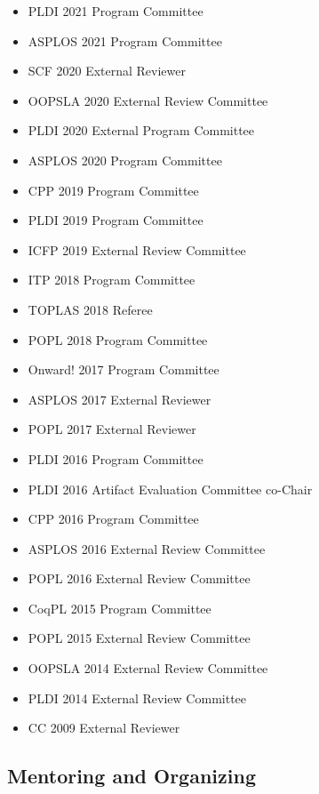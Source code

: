 \documentclass[10pt]{article}
\begin{document}
\begin{itemize}
  \item PLDI 2021 Program Committee
  \item ASPLOS 2021 Program Committee
  \item SCF 2020 External Reviewer
  \item OOPSLA 2020 External Review Committee
  \item PLDI 2020 External Program Committee
  \item ASPLOS 2020 Program Committee
  \item CPP 2019 Program Committee
  \item PLDI 2019 Program Committee
  \item ICFP 2019 External Review Committee
  \item ITP 2018 Program Committee
  \item TOPLAS 2018 Referee
  \item POPL 2018 Program Committee
  \item Onward! 2017 Program Committee
  \item ASPLOS 2017 External Reviewer
  \item POPL 2017 External Reviewer
  \item PLDI 2016 Program Committee
  \item PLDI 2016 Artifact Evaluation Committee co-Chair
  \item CPP 2016 Program Committee
  \item ASPLOS 2016 External Review Committee
  \item POPL 2016 External Review Committee
  \item CoqPL 2015 Program Committee
  \item POPL 2015 External Review Committee
  \item OOPSLA 2014 External Review Committee
  \item PLDI 2014 External Review Committee
  \item CC 2009 External Reviewer
\end{itemize}

\subsection*{Mentoring and Organizing}
\end{document}
